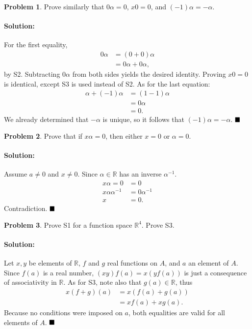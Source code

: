 \documentclass[]{article}
\newcommand{\RR}{\mathbb{R}}
\theoremstyle{definition}
\newtheorem{problem}{Problem}
\newenvironment{solution}{\paragraph{Solution:}}{\hfill$\blacksquare \\$}
\begin{document}
\begin{problem}
	Prove similarly that $0\alpha = 0$, $x0 = 0$, and $(-1)\alpha = -\alpha$.
\end{problem}
\begin{solution}
For the first equality, 
\begin{align*}
	0\alpha &= (0 + 0)\alpha \\
	& = 0\alpha + 0\alpha,
\end{align*}
 by S2. Subtracting $0\alpha$ from both sides yields the desired identity. Proving $x0 = 0$ is identical, except S3 is used instead of S2. As for the last equation:
 \begin{align*}
 	\alpha + (-1)\alpha &= (1 - 1)\alpha \\
 	&= 0\alpha \\
 	&= 0.
 \end{align*}
 We already determined that $-\alpha$ is unique, so it follows that $(-1)\alpha = -\alpha$.
\end{solution}
\begin{problem}
	Prove that if $x\alpha = 0$, then either $x=0$ or $\alpha=0$.
\end{problem}
\begin{solution}
	Assume $a \neq 0$ and $x \neq 0$. Since $\alpha \in \RR$ has an inverse $\alpha^{-1}$.
	\begin{align*}
		x\alpha = 0 &= 0 \\
		x\alpha \alpha^{-1} &= 0 \alpha^{-1} \\
		x &= 0.
	\end{align*}
	Contradiction.
\end{solution}
\begin{problem}
	Prove S1 for a function space $\RR^4$. Prove S3.
\end{problem}
\begin{solution}
	Let $x,y$ be elements of $\RR$, $f$ and $g$ real functions on $A$, and $a$ an element of $A$. \\
	Since $f(a)$ is a real number, $(xy)f(a) = x(yf(a))$ is just a consequence of associativity in $\RR$. As for S3, note also that $g(a) \in \RR$, thus
	\begin{align*}
		x(f + g)(a) &= x(f(a) + g(a)) \\
		&= xf(a) + xg(a).
	\end{align*}
Because no conditions were imposed on $a$, both equalities are valid for all elements of $A$.
\end{solution}
\end{document}
